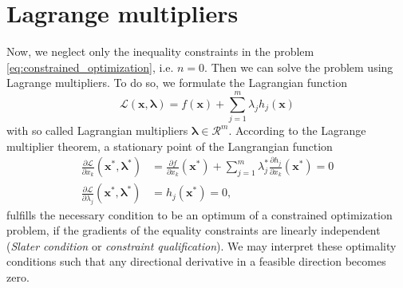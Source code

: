 

\section{Lagrange multipliers}
Now, we neglect only the inequality constraints in the problem \eqref{eq:constrained_optimization}, i.e. $n=0$. Then we can solve the problem using Lagrange multipliers. To do so, we formulate the Lagrangian function
\begin{equation}
    \mathcal{\mathcal{L}} (\mathbf{x}, \pmb{\lambda}) = f(\mathbf{x}) + \sum_{j=1}^m \lambda_j h_j(\mathbf{x}) 
\end{equation}
with so called Lagrangian multipliers $\pmb{\lambda} \in \mathcal{R}^m$. 
According to the Lagrange multiplier theorem, a stationary point of the Langrangian function 
\begin{align}
    \frac{\partial \mathcal{\mathcal{L}}}{\partial x_k} (\mathbf{x}^*, \pmb{\lambda}^*) &= \frac{\partial f }{\partial x_k} (\mathbf{x}^*) + \sum_{j=1}^m \lambda_j^* \frac{\partial h_j}{\partial x_k} (\mathbf{x}^*) = 0\\
    \frac{\partial \mathcal{\mathcal{L}}}{\partial \lambda_j} (\mathbf{x}^*, \pmb{\lambda}^*) &= h_j(\mathbf{x}^*) = 0,
\end{align}
fulfills the necessary condition to be an optimum of a constrained optimization problem, if the gradients of the equality constraints are linearly independent (\emph{Slater condition} or \emph{constraint qualification}). We may interpret these optimality conditions such that any directional derivative in a feasible direction becomes zero.


